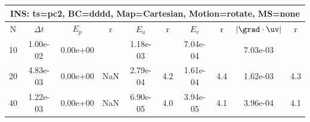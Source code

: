 
\begin{tabular}{|c|c|c|c|c|c|c|c|c|c|} \hline
 \multicolumn{10}{|c|}{INS: ts=pc2, BC=dddd, Map=Cartesian, Motion=rotate, MS=none } \\ \hline 
     N  &   $\Delta t$ & $E_p$   &  r  &   $E_u$   &   r    &   $E_v$   & r   &  $|\grad\cdot\uv|$  & r   \\ \hline 
  10   &  1.00e-02  &   0.00e+00  &        &   1.18e-03  &        &   7.04e-04  &        &   7.03e-03  &        \\ 
  20   &  4.83e-03  &   0.00e+00  & NaN  &   2.79e-04  & 4.2  &   1.61e-04  & 4.4  &   1.62e-03  & 4.3  \\ 
  40   &  1.22e-03  &   0.00e+00  & NaN  &   6.90e-05  & 4.0  &   3.94e-05  & 4.1  &   3.96e-04  & 4.1  \\ 
 \hline 
\end{tabular}
